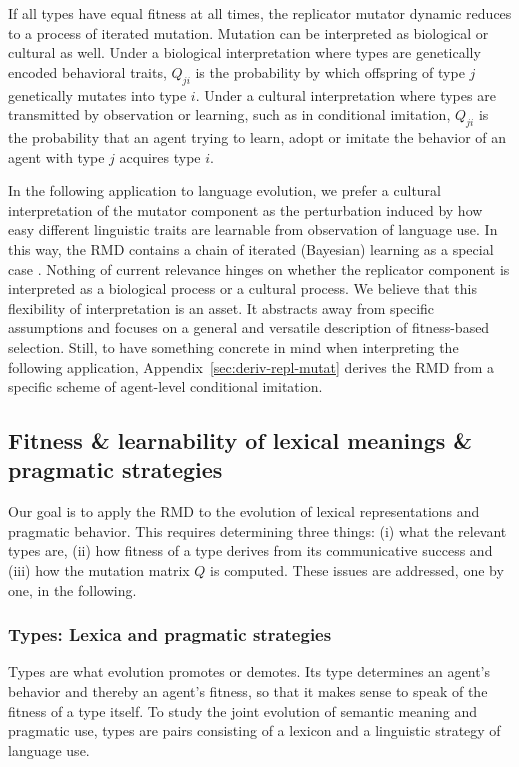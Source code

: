 \documentclass[a4paper, 11pt]{article}
\theoremstyle{Satz}
\begin{document}
If all types have equal fitness at all times, the replicator mutator dynamic reduces to a
process of iterated mutation. Mutation can be interpreted as biological or cultural as
well. Under a biological interpretation where types are genetically encoded behavioral traits,
$Q_{ji}$ is the probability by which offspring of type $j$ genetically mutates into type
$i$. Under a cultural interpretation where types are transmitted by observation or learning,
such as in conditional imitation, $Q_{ji}$ is the probability that an agent trying to learn,
adopt or imitate the behavior of an agent with type $j$ acquires type $i$.

In the following application to language evolution, we prefer a cultural interpretation of the
mutator component as the perturbation induced by how easy different linguistic traits are
learnable from observation of language use. In this way, the RMD contains a chain of iterated
(Bayesian) learning as a special case
\citep{griffiths+kalish:2005,griffiths+kalish:2007}. Nothing of current relevance hinges on
whether the replicator component is interpreted as a biological process or a cultural
process. We believe that this flexibility of interpretation is an asset. It abstracts away from
specific assumptions and focuses on a general and versatile description of fitness-based
selection. Still, to have something concrete in mind when interpreting the following
application, Appendix~\ref{sec:deriv-repl-mutat} derives the RMD from a specific scheme of
agent-level conditional imitation.


\subsection{Fitness \& learnability of lexical meanings \& pragmatic strategies}
\label{sec:fitn--learn}


Our goal is to apply the RMD to the evolution of lexical representations and pragmatic
behavior. This requires determining three things: (i) what the relevant types are, (ii) how
fitness of a type derives from its communicative success and (iii) how the mutation matrix $Q$
is computed. These issues are addressed, one by one, in the following.

\subsubsection{Types: Lexica and pragmatic strategies}
\label{sec:languages+use}
Types are what evolution promotes or demotes. Its type determines an agent's behavior and thereby
an agent's fitness, so that it makes sense to speak of the fitness of a type itself. To study
the joint evolution of semantic meaning and pragmatic use, types are pairs consisting of a
lexicon and a linguistic strategy of language use.
\end{document}
